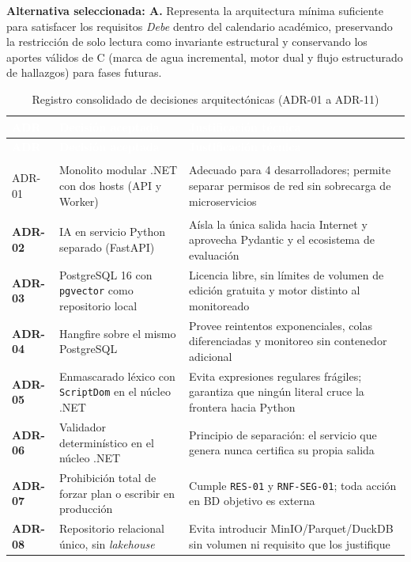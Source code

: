 \documentclass[12pt,a4paper]{article}
\begin{document}
\textbf{Alternativa seleccionada: A.} Representa la arquitectura mínima suficiente para satisfacer los requisitos \textit{Debe} dentro del calendario académico, preservando la restricción de solo lectura como invariante estructural y conservando los aportes válidos de C (marca de agua incremental, motor dual y flujo estructurado de hallazgos) para fases futuras.

\begingroup
{}
\small
\begin{longtable}{>{\bfseries}p{} p{} p{}}
\toprule
\rowcolor{utbblue}
\textcolor{white}{\textbf{ADR}} & \textcolor{white}{\textbf{Decisión aceptada}} & \textcolor{white}{\textbf{Justificación técnica}} \\
\midrule
\endfirsthead
\toprule
\rowcolor{utbblue}
\textcolor{white}{\textbf{ADR}} & \textcolor{white}{\textbf{Decisión aceptada}} & \textcolor{white}{\textbf{Justificación técnica}} \\
\midrule
\endhead
\bottomrule
\caption{Registro consolidado de decisiones arquitectónicas (ADR-01 a ADR-11)}
\label{tab:adrs}
\endlastfoot
ADR-01 & Monolito modular .NET con dos hosts (API y Worker) & Adecuado para 4 desarrolladores; permite separar permisos de red sin sobrecarga de microservicios \\
ADR-02 & IA en servicio Python separado (FastAPI) & Aísla la única salida hacia Internet y aprovecha Pydantic y el ecosistema de evaluación \\
ADR-03 & PostgreSQL 16 con \texttt{pgvector} como repositorio local & Licencia libre, sin límites de volumen de edición gratuita y motor distinto al monitoreado \\
ADR-04 & Hangfire sobre el mismo PostgreSQL & Provee reintentos exponenciales, colas diferenciadas y monitoreo sin contenedor adicional \\
ADR-05 & Enmascarado léxico con \texttt{ScriptDom} en el núcleo .NET & Evita expresiones regulares frágiles; garantiza que ningún literal cruce la frontera hacia Python \\
ADR-06 & Validador determinístico en el núcleo .NET & Principio de separación: el servicio que genera nunca certifica su propia salida \\
ADR-07 & Prohibición total de forzar plan o escribir en producción & Cumple \texttt{RES-01} y \texttt{RNF-SEG-01}; toda acción en BD objetivo es externa \\
ADR-08 & Repositorio relacional único, sin \textit{lakehouse} & Evita introducir MinIO/Parquet/DuckDB sin volumen ni requisito que los justifique \\

\end{longtable}
\end{document}

